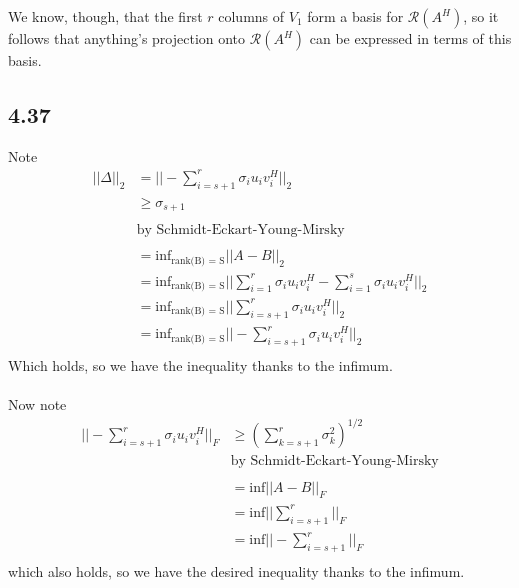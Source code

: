 \documentclass[letterpaper,12pt]{article}
\theoremstyle{definition}
\begin{document}
We know, though, that the first $r$ columns of $V_1$ form a basis for $\mathscr{R}(A^H)$, so it follows that anything's projection onto $\mathscr{R}(A^H)$ can be expressed in terms of this basis.

\subsection*{4.37}
Note
\begin{align*}
    || \Delta||_2 &= || - \sum^{r}_{i = s+1} \sigma_i u_i v_i^H||_2 \\ 
    &\geq \sigma_{s+1} \\ \\
    &\text{by Schmidt-Eckart-Young-Mirsky}\\\\
    &= \text{inf}_\text{rank(B) = S} ||A-B||_2 \\ 
    &= \text{inf}_\text{rank(B) = S} || \sum^{r}_{i=1}  \sigma_iu_iv_i^H - \sum^{s}_{i=1}  \sigma_iu_iv_i^H||_2 \\ 
    &= \text{inf}_\text{rank(B) = S} || \sum^{r}_{i=s+1}  \sigma_iu_iv_i^H ||_2 \\ 
    &= \text{inf}_\text{rank(B) = S} || - \sum^{r}_{i=s+1}  \sigma_iu_iv_i^H ||_2 \\ 
\end{align*}
Which holds, so we have the inequality thanks to the infimum.\\\\

Now note
\begin{align*}
    ||- \sum^{r}_{i=s+1} \sigma_iu_iv_i^H ||_F &\geq \left( \sum^{r}_{k = s+1} \sigma_k^2 \right)^{1/2}\\
    &\text{by Schmidt-Eckart-Young-Mirsky}\\\\
    &= \text{inf} ||A-B||_F \\
    &= \text{inf} || \sum^{r}_{i=s+1} ||_F \\
    &= \text{inf} || -\sum^{r}_{i=s+1} ||_F \\
\end{align*}
which also holds, so we have the desired inequality thanks to the infimum.
\end{document}
